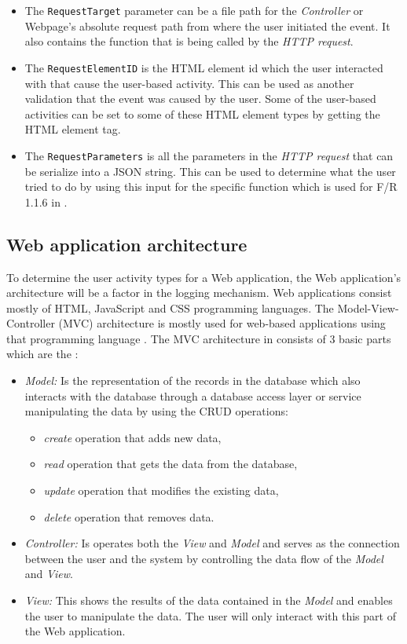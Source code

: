 \begin{itemize}
	\item The \texttt{RequestTarget} parameter can be a file path for the \textit{Controller} or Webpage's absolute request path from where the user initiated the event. It also contains the function that is being called by the \textit{HTTP request}.
	\item The \texttt{RequestElementID} is the HTML element id which the user interacted with that cause the user-based activity. This can be used as another validation that the event was caused by the user. Some of the user-based activities can be set to some of these HTML element types by getting the HTML element tag.
	\item The \texttt{RequestParameters} is all the parameters in the \textit{HTTP request} that can be serialize into a JSON string. This can be used to determine what the user tried to do by using this input for the specific function which is used for F/R 1.1.6 in .
\end{itemize}

\subsection{Web application architecture}\label{sec:ch2_webApplicationArchitecture}
To determine the user activity types for a Web application, the Web application's architecture will be a factor in the logging mechanism. Web applications consist mostly of HTML, JavaScript and CSS programming languages. The Model-View-Controller (MVC) architecture is mostly used for web-based applications using that programming language \cite{Jailia2016}. The MVC architecture in  consists of 3 basic parts which are the \cite{Jailia2016}:

\begin{itemize}
	\item \textit{Model:} Is the representation of the records in the database which also interacts with the database through a database access layer or service manipulating the data by using the CRUD operations:
	\begin{itemize}
		\item \textit{create} operation that adds new data,
		\item \textit{read} operation that gets the data from the database,
		\item \textit{update} operation that modifies the existing data,
		\item \textit{delete} operation that removes data.
	\end{itemize}
	\item \textit{Controller:} Is operates both the \textit{View} and \textit{Model} and serves as the connection between the user and the system by controlling the data flow of the \textit{Model} and
	\textit{View}.
	\item \textit{View:} This shows the results of the data contained in the \textit{Model} and enables the user to manipulate the data. The user will only interact with this part of the Web application.
\end{itemize}

